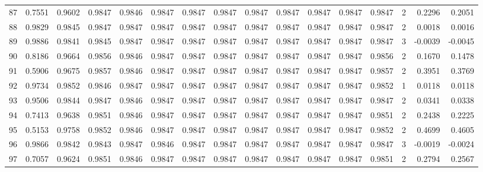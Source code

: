 \begin{tabular}{lrrrrrrrrrrrrrrr}
87  &      0.7551 &  0.9602 &  0.9847 &  0.9846 &  0.9847 &  0.9847 &  0.9847 &  0.9847 &  0.9847 &  0.9847 &   0.9847 &     0.9847 &      2 &                    0.2296 &                     0.2051 \\
88  &      0.9829 &  0.9845 &  0.9847 &  0.9847 &  0.9847 &  0.9847 &  0.9847 &  0.9847 &  0.9847 &  0.9847 &   0.9847 &     0.9847 &      2 &                    0.0018 &                     0.0016 \\
89  &      0.9886 &  0.9841 &  0.9845 &  0.9847 &  0.9847 &  0.9847 &  0.9847 &  0.9847 &  0.9847 &  0.9847 &   0.9847 &     0.9847 &      3 &                   -0.0039 &                    -0.0045 \\
90  &      0.8186 &  0.9664 &  0.9856 &  0.9846 &  0.9847 &  0.9847 &  0.9847 &  0.9847 &  0.9847 &  0.9847 &   0.9847 &     0.9856 &      2 &                    0.1670 &                     0.1478 \\
91  &      0.5906 &  0.9675 &  0.9857 &  0.9846 &  0.9847 &  0.9847 &  0.9847 &  0.9847 &  0.9847 &  0.9847 &   0.9847 &     0.9857 &      2 &                    0.3951 &                     0.3769 \\
92  &      0.9734 &  0.9852 &  0.9846 &  0.9847 &  0.9847 &  0.9847 &  0.9847 &  0.9847 &  0.9847 &  0.9847 &   0.9847 &     0.9852 &      1 &                    0.0118 &                     0.0118 \\
93  &      0.9506 &  0.9844 &  0.9847 &  0.9846 &  0.9847 &  0.9847 &  0.9847 &  0.9847 &  0.9847 &  0.9847 &   0.9847 &     0.9847 &      2 &                    0.0341 &                     0.0338 \\
94  &      0.7413 &  0.9638 &  0.9851 &  0.9846 &  0.9847 &  0.9847 &  0.9847 &  0.9847 &  0.9847 &  0.9847 &   0.9847 &     0.9851 &      2 &                    0.2438 &                     0.2225 \\
95  &      0.5153 &  0.9758 &  0.9852 &  0.9846 &  0.9847 &  0.9847 &  0.9847 &  0.9847 &  0.9847 &  0.9847 &   0.9847 &     0.9852 &      2 &                    0.4699 &                     0.4605 \\
96  &      0.9866 &  0.9842 &  0.9843 &  0.9847 &  0.9846 &  0.9847 &  0.9847 &  0.9847 &  0.9847 &  0.9847 &   0.9847 &     0.9847 &      3 &                   -0.0019 &                    -0.0024 \\
97  &      0.7057 &  0.9624 &  0.9851 &  0.9846 &  0.9847 &  0.9847 &  0.9847 &  0.9847 &  0.9847 &  0.9847 &   0.9847 &     0.9851 &      2 &                    0.2794 &                     0.2567 \\

\end{tabular}
